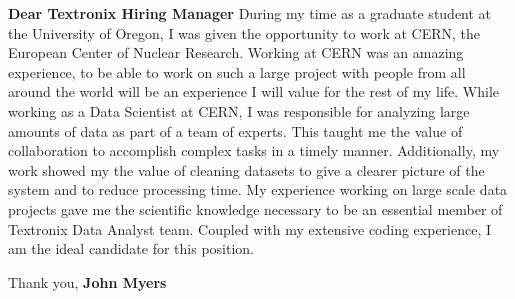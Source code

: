 \documentclass[a4paper]{article}
\title{}
\author{John C.S. Myers}
\date{\today}
\begin{document}
\fontsize{12}{15}
\selectfont
\maketitle


\textbf{Dear Textronix Hiring Manager}\newline\newline
\newline\newline
During my time as a graduate student at the University of Oregon, I was given the opportunity to work at CERN, the European Center of Nuclear Research. Working at CERN was an amazing experience, to be able to work on such a large project with people from all around the world will be an experience I will value for the rest of my life.\newline\newline
While working as a Data Scientist at CERN, I was responsible for analyzing large amounts of data as part of a team of experts. This taught me the value of collaboration to accomplish complex tasks in a timely manner. Additionally, my work showed my the value of cleaning datasets to give a clearer picture of the system and to reduce processing time.\newline\newline
My experience working on large scale data projects gave me the scientific knowledge necessary to be an essential member of Textronix Data Analyst team. Coupled with my extensive coding experience, I am the ideal candidate for this position.\newline\newline

Thank you,
\newline
\textbf{John Myers}
\end{document}
